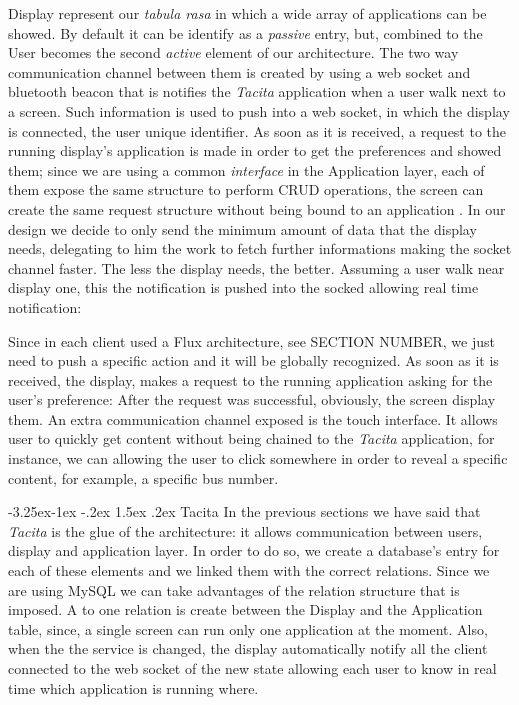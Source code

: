 \documentclass[]{usiinfbachelorproject}
\makeatletter
\newcommand\subsubsection{\@startsection{subsubsection}{3}{\z@}%
                {-3.25ex\@plus -1ex \@minus -.2ex}%
                {1.5ex \@plus .2ex}%
                {\normalfont\normalsize\bfseries}}
\makeatother
\begin{document}
Display represent our \emph{tabula rasa} in which a wide array of applications can be showed. By default it can be identify as a \emph{passive} entry, but, combined to the User becomes the second \emph{active} element of our architecture. The two way communication channel between them is created by using a web socket and bluetooth beacon that is notifies the \emph{Tacita} application when a user walk next to a screen. Such information is used to push into a web socket, in which the display is connected, the user unique identifier. As soon as it is received, a request to the running display's application is made in order to get the preferences and showed them; since we are using a common \emph{interface} in the Application layer, each of them expose the same structure to perform CRUD operations, the screen can create the same request structure without being bound to an application .
In our design we decide to only send the minimum amount of data that the display needs, delegating to him the work to fetch further informations making the socket channel faster. The less the display needs, the better. Assuming a user walk near display one, this the notification is pushed into the socked allowing real time notification:

Since in each client used a Flux architecture, see SECTION NUMBER, we just need to push a specific action and it will be globally recognized. As soon as it is received, the display, makes a request to the running application asking for the user's preference:
After the request was successful, obviously, the screen display them.
 An extra communication channel exposed is the touch interface. It allows user to quickly get content without being chained to the \emph{Tacita} application, for instance, we can allowing the user to click somewhere in order to reveal a specific content, for example, a specific bus number.
  
\subsubsection{Tacita}
In the previous sections we have said that \emph{Tacita} is the glue of the architecture: it allows communication between users, display and application layer. In order to do so, we create a database's entry for each of these elements and we linked them with the correct relations. Since we are using MySQL we can take advantages of the relation structure that is imposed. A \one to one relation is create between the Display and the Application table, since, a single screen can run only one application at the moment. Also, when the the service is changed, the display automatically notify all the client connected to the web socket of the new state allowing each user to know in real time which application is running where.
\end{document}
